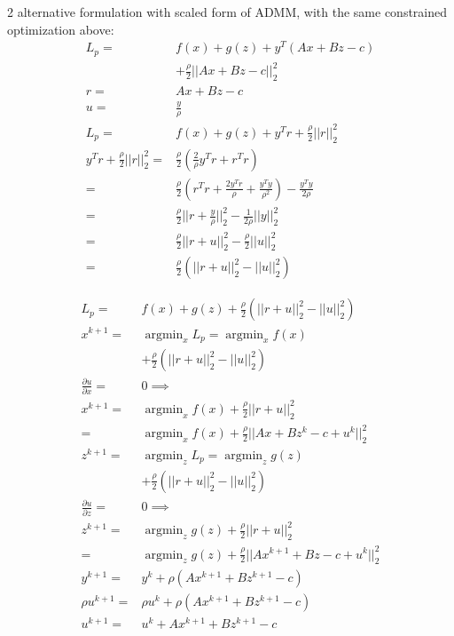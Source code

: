 \documentclass[8pt]{extarticle}
\DeclareMathOperator*{\argmin}{argmin}
\begin{document}
\begin{multicols*}{2}
  alternative formulation with scaled form of ADMM, with the same constrained optimization above:
  \begin{align*}
    L_p = & f(x) + g(z) + y^T(Ax+Bz-c)\\
          & + \frac{\rho}{2} ||Ax+Bz-c||_2^2\\
    r= & Ax+Bz-c\\
           u = & \frac{y}{\rho}\\
           L_p = & f(x) + g(z) + y^T r + \frac{\rho}{2} ||r||_2^2\\
    y^T r + \frac{\rho}{2} ||r||_2^2 = & \frac{\rho}{2}( \frac{2}{\rho} y^T r + r^T r)\\
    = & \frac{\rho}{2}(r^T r + \frac{2 y^T r}{\rho} + \frac{ y^T y}{\rho ^2}) - \frac{y^T y}{2\rho}\\
    = & \frac{\rho}{2} ||r+\frac{y}{\rho}||_2^2 - \frac{1}{2 \rho} ||y||_2^2\\
    = & \frac{\rho}{2} ||r+u||_2^2 - \frac{\rho}{2}||u||_2^2\\
    = & \frac{\rho}{2} (||r+u||_2^2 - ||u||_2^2)
  \end{align*}

  \vfill\null
  \columnbreak
  
  \begin{align*}
    L_p = & f(x) + g(z) + \frac{\rho}{2} (||r+u||_2^2 - ||u||_2^2)\\
    x^{k+1} = & \argmin_{x} L_p = \argmin_{x} f(x)\\
          & + \frac{\rho}{2}(||r+u||_2^2-||u||_2^2)\\
    \frac{\partial u}{\partial x} = & 0 \implies\\
    x^{k+1} = & \argmin_{x} f(x) + \frac{\rho}{2}||r+u||_2^2\\
    = & \argmin_{x} f(x) + \frac{\rho}{2}||Ax + Bz^k - c + u^k||_2^2\\
    z^{k+1} = & \argmin_{z} L_p = \argmin_{z} g(z)\\
          & + \frac{\rho}{2}(||r+u||_2^2-||u||_2^2)\\
    \frac{\partial u}{\partial z} = & 0 \implies\\
    z^{k+1} = & \argmin_{z} g(z) + \frac{\rho}{2}||r+u||_2^2\\
          = & \argmin_{z} g(z) + \frac{\rho}{2}||Ax^{k+1} + Bz - c + u^k||_2^2\\
    y^{k+1} = & y^k + \rho (Ax^{k+1} +Bz^{k+1} - c)\\
    \rho u^{k+1} = & \rho u^k + \rho (Ax^{k+1} +Bz^{k+1} - c)\\
    u^{k+1} = & u^k + Ax^{k+1} +Bz^{k+1} - c
  \end{align*}


\end{multicols*}
\end{document}
